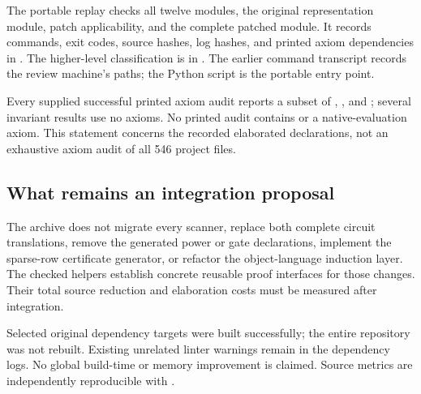 The portable  replay checks all twelve modules, the original representation module, patch applicability, and the complete patched module. It records commands, exit codes, source hashes, log hashes, and printed axiom dependencies in . The higher-level classification is in . The earlier command transcript records the review machine's paths; the Python script is the portable entry point.

Every supplied successful printed axiom audit reports a subset of , , and ; several invariant results use no axioms. No printed audit contains  or a native-evaluation axiom. This statement concerns the recorded elaborated declarations, not an exhaustive axiom audit of all 546 project files.

\subsection{What remains an integration proposal}

The archive does not migrate every scanner, replace both complete circuit translations, remove the generated power or gate declarations, implement the sparse-row certificate generator, or refactor the object-language induction layer. The checked helpers establish concrete reusable proof interfaces for those changes. Their total source reduction and elaboration costs must be measured after integration.

Selected original dependency targets were built successfully; the entire repository was not rebuilt. Existing unrelated linter warnings remain in the dependency logs. No global build-time or memory improvement is claimed. Source metrics are independently reproducible with .
